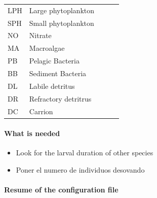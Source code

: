\documentclass[11pt]{article}
\begin{document}
\begin{center}
\begin{tabular}{lllll}
 LPH   &  Large phytoplankton   &     &               &         \\
 SPH   &  Small phytoplankton   &     &               &         \\
 NO    &  Nitrate               &     &               &         \\
 MA    &  Macroalgae            &     &               &         \\
 PB    &  Pelagic Bacteria      &     &               &         \\
 BB    &  Sediment Bacteria     &     &               &         \\
 DL    &  Labile detritus       &     &               &         \\
 DR    &  Refractory detritrus  &     &               &         \\
 DC    &  Carrion               &     &               &         \\
\hline
\end{tabular}
\end{center}
\paragraph*{What is needed}
\label{sec-5-2-1-18}
\begin{itemize}

\item Look for the larval duration of other species
\label{sec-5-2-1-18-1}%

\item Poner el numero de individuos desovando
\label{sec-5-2-1-18-2}%
\end{itemize} %
\paragraph*{Resume of the configuration file}
\label{sec-5-2-1-19}
\end{document}
